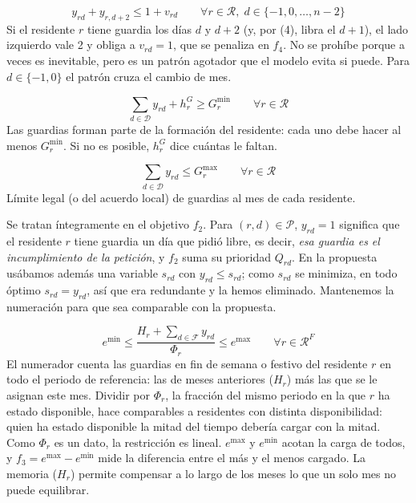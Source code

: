 \[
y_{rd} + y_{r,d+2} \le 1 + v_{rd} \qquad \forall r \in \mathcal{R},\; d \in \{-1, 0, \dots, n-2\}
\]
Si el residente $r$ tiene guardia los días $d$ y $d+2$ (y, por (4), libra el $d+1$), el lado izquierdo vale 2 y obliga a $v_{rd} = 1$, que se penaliza en $f_4$. No se prohíbe porque a veces es inevitable, pero es un patrón agotador que el modelo evita si puede. Para $d \in \{-1, 0\}$ el patrón cruza el cambio de mes.

\[
\sum_{d \in \mathcal{D}} y_{rd} + h^{G}_{r} \ge G^{\min}_r \qquad \forall r \in \mathcal{R}
\]
Las guardias forman parte de la formación del residente: cada uno debe hacer al menos $G^{\min}_r$. Si no es posible, $h^{G}_{r}$ dice cuántas le faltan.

\[
\sum_{d \in \mathcal{D}} y_{rd} \le G^{\max}_r \qquad \forall r \in \mathcal{R}
\]
Límite legal (o del acuerdo local) de guardias al mes de cada residente.

\par\noindent Se tratan íntegramente en el objetivo $f_2$. Para $(r, d) \in \mathcal{P}$, $y_{rd} = 1$ significa que el residente $r$ tiene guardia un día que pidió libre, es decir, \emph{esa guardia es el incumplimiento de la petición}, y $f_2$ suma su prioridad $Q_{rd}$. En la propuesta usábamos además una variable $s_{rd}$ con $y_{rd} \le s_{rd}$; como $s_{rd}$ se minimiza, en todo óptimo $s_{rd} = y_{rd}$, así que era redundante y la hemos eliminado. Mantenemos la numeración para que sea comparable con la propuesta.

\[
e^{\min} \le \frac{H_r + \sum_{d \in \mathcal{F}} y_{rd}}{\Phi_r} \le e^{\max} \qquad \forall r \in \mathcal{R}^F
\]
El numerador cuenta las guardias en fin de semana o festivo del residente $r$ en todo el periodo de referencia: las de meses anteriores ($H_r$) más las que se le asignan este mes. Dividir por $\Phi_r$, la fracción del mismo periodo en la que $r$ ha estado disponible, hace comparables a residentes con distinta disponibilidad: quien ha estado disponible la mitad del tiempo debería cargar con la mitad. Como $\Phi_r$ es un dato, la restricción es lineal. $e^{\max}$ y $e^{\min}$ acotan la carga de todos, y $f_3 = e^{\max} - e^{\min}$ mide la diferencia entre el más y el menos cargado. La memoria ($H_r$) permite compensar a lo largo de los meses lo que un solo mes no puede equilibrar.

